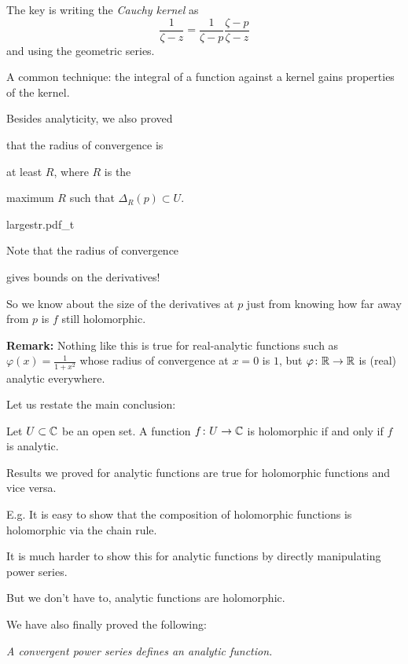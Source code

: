 \documentclass[10pt,aspectratio=169]{beamer}
\begin{document}
\begin{frame}

The key is writing the \emph{Cauchy kernel}
as
\[
\frac{1}{\zeta-z}
=
\frac{1}{\zeta-p}
\frac{\zeta-p}{\zeta-z}
\]
\pause
and using the geometric series.

\medskip

A common technique: the integral of a function against a kernel
gains properties of the kernel.

\pause
\medskip

Besides analyticity,
we also proved 

that the radius of convergence is

at least $R$, where $R$ is the

maximum $R$ such that $\Delta_R(p) \subset U$.

\vspace*{-0.85in}

\hspace*{2.5in}%
{largestr.pdf_t}

\pause

\vspace*{-0.30in}
Note that the radius of convergence

gives bounds on the derivatives!

\pause

So we know about
the size of the derivatives at $p$ just from knowing how far away from $p$
is
$f$ still holomorphic.

\medskip
\pause

\textbf{Remark:}
Nothing like this is true for real-analytic functions such as $\varphi(x) =
\frac{1}{1+x^2}$ whose radius of convergence at $x=0$ is $1$, but $\varphi \colon
{\mathbb{R}} \to {\mathbb{R}}$ is (real) analytic everywhere.

\end{frame}

\begin{frame}
Let us restate the main conclusion:

\begin{corollary}
Let $U \subset {\mathbb{C}}$ be an open set.  A function $f \colon U \to {\mathbb{C}}$
is holomorphic if and only if $f$ is analytic.
\end{corollary}

\medskip
\pause

Results we proved for analytic functions are true for holomorphic
functions and vice versa.

\medskip
\pause

E.g. It is easy to show 
that the composition of
holomorphic functions is holomorphic via the chain rule.

\pause
\medskip

It is much harder to show this for analytic functions
by directly manipulating power series.

\pause
\medskip

But we don't have to, analytic functions are holomorphic.

\pause
\medskip

We have also finally proved the following:

\emph{A convergent power series defines an analytic function.}
\end{frame}
\end{document}
